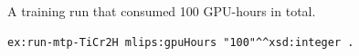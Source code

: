 A training run that consumed 100 GPU-hours in total.
\begin{lstlisting}[language=turtle]
ex:run-mtp-TiCr2H mlips:gpuHours "100"^^xsd:integer .
\end{lstlisting}
